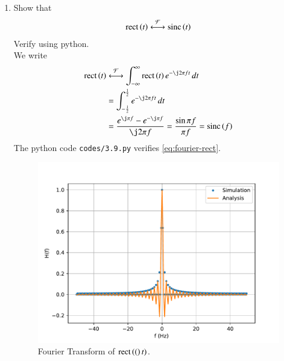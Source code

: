 \documentclass[journal,12pt,twocolumn]{IEEEtran}
\renewcommand\thesection{\arabic{section}}
\begin{document}
\begin{enumerate}[label=\thesection.\arabic*
,ref=\thesection.\theenumi]
\begin{figure}[!ht]
\caption{Fourier Transform of $x(t)$.}
\label{eq:fig-fourier-xt}
\end{figure}
\item Show that
\begin{align}
\text{rect}\left(t\right) \overset{\mathcal{F}}{ \longleftrightarrow} \text{sinc}\left(t\right)
\end{align}
Verify using python. \\
\solution We write
\begin{align}
\rect{t}&\system{F}\int_{-\infty}^{\infty}\rect{t}e^{-\j2\pi ft}\, dt \\
&=\int_{-\frac{1}{2}}^{\frac{1}{2}}e^{-\j2\pi ft}\, dt \\
&=\frac{e^{\j\pi f} - e^{-\j\pi f}}{\j2\pi f} = \frac{\sin{\pi f}}{\pi f} = \sinc{f}
\label{eq:fourier-rect}
\end{align}
The python code \texttt{codes/3.9.py} verifies \eqref{eq:fourier-rect}.
\begin{figure}[!ht]
\includegraphics[width=\columnwidth]{figs/3.9.pdf}
\caption{Fourier Transform of $\text{rect}\left((\right)t)$.}
\label{eq:fig-fourier-rect}
\end{figure}


\end{enumerate}
\end{document}
